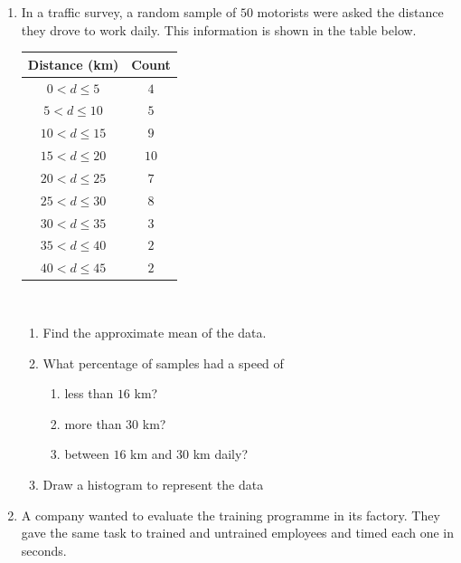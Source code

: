 \begin{eocexercises}{}
\begin{enumerate}[itemsep=6pt, label=\textbf{\arabic*}.]
  \item In a traffic survey, a random sample of $50$ motorists were
    asked the distance they drove to work daily. This information is
    shown in the table below.\\
    \begin{center}
      \begin{tabular}{|c|c|} \hline
     
        \textbf{Distance (km)} & \textbf{Count} \\ \hline

        $0 < d \le 5$ & $4$ \\ \hline
        $5 < d \le 10$ & $5$ \\\hline
        $10 < d \le 15$ & $9$ \\\hline
        $15 < d \le 20$ & $10$ \\\hline
        $20 < d \le 25$ & $7$ \\\hline
        $25 < d \le 30$ & $8$ \\\hline
        $30 < d \le 35$ & $3$ \\\hline
        $35 < d \le 40$ & $2$ \\\hline
        $40 < d \le 45$ & $2$ \\\hline

      \end{tabular}
    \end{center}
\vspace {8pt}\\
     \begin{enumerate}[noitemsep, label=\textbf{(\alph*)} ]
    \item Find the approximate mean of the data.
    \item What percentage of samples had a speed of
      \begin{enumerate}[noitemsep, label=\textbf{\roman*}. ]
      \item less than $16$ km?
      \item more than $30$ km?
      \item between $16$ km and $30$ km daily?
      \end{enumerate}
\item Draw a histogram to represent the data
    \end{enumerate}

  \item A company wanted to evaluate the training programme in its
    factory. They gave the same task to trained and untrained
    employees and timed each one in seconds.
\\
    \begin{center}
      \begin{tabular}{|l|c|c|c|c|c|} \hline


\end{tabular}
\end{center}
\end{enumerate}
\end{eocexercises}

